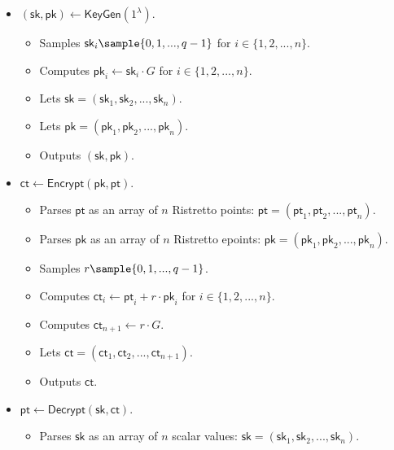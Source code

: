 \documentclass{article}
\begin{document}
\begin{itemize}
    \item $\left(\mathsf{sk}, \mathsf{pk}\right)\leftarrow \mathsf{KeyGen}\left(1^\lambda\right)$.
    \begin{itemize}
        \item Samples $\mathsf{sk}_i\sample\{0, 1, ..., q-1\}$ for $i\in\{1,2,...,n\}$. 
        \item Computes $\mathsf{pk}_i\leftarrow \mathsf{sk}_i\cdot G$ for $i\in\{1,2,...,n\}$.
        \item Lets $\mathsf{sk}=(\mathsf{sk}_1,\mathsf{sk}_2,...,\mathsf{sk}_{n})$.
        \item Lets $\mathsf{pk}=(\mathsf{pk}_1,\mathsf{pk}_2,...,\mathsf{pk}_{n})$.
        \item Outputs $(\mathsf{sk}, \mathsf{pk})$.
    \end{itemize}
    
    \item $\mathsf{ct}\leftarrow\mathsf{Encrypt}(\mathsf{pk},\mathsf{pt})$. 
    \begin{itemize}
        \item Parses $\mathsf{pt}$ as an array of $n$ Ristretto points: $\mathsf{pt}=(\mathsf{pt}_1, \mathsf{pt}_2, ..., \mathsf{pt}_n)$. 
        
        \item Parses $\mathsf{pk}$ as an array of $n$ Ristretto epoints: $\mathsf{pk}=(\mathsf{pk}_1, \mathsf{pk}_2, ..., \mathsf{pk}_n)$.
        
        \item Samples $r\sample\{0, 1, ..., q-1\}$.
        
        \item Computes $\mathsf{ct}_i\leftarrow \mathsf{pt}_i + r \cdot \mathsf{pk}_i$ for $i\in\{1,2,...,n\}$.
        
        \item Computes $\mathsf{ct}_{n+1}\leftarrow r\cdot G$. 
        
        \item Lets $\mathsf{ct}=(\mathsf{ct}_1, \mathsf{ct}_2, ..., \mathsf{ct}_{n+1})$.
        
        \item Outputs $\mathsf{ct}$.
    \end{itemize}
    
    \item $\mathsf{pt}\leftarrow\mathsf{Decrypt}\left(\mathsf{sk},\mathsf{ct}\right)$.
    \begin{itemize}
        \item Parses $\mathsf{sk}$ as an array of $n$ scalar values: $\mathsf{sk}=(\mathsf{sk}_1, \mathsf{sk}_2, ..., \mathsf{sk}_n)$.
        

\end{itemize}
\end{itemize}
\end{document}
